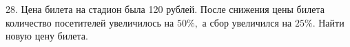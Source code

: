 28. Цена билета на стадион была 120 рублей. После снижения цены билета количество посетителей увеличилось на $50\%,$ а сбор увеличился на $25\%.$ Найти новую цену билета.\\
